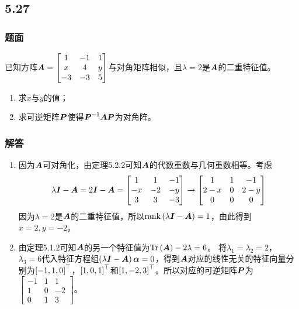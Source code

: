 \documentclass[9pt,xcolor=svgnames]{beamer} %
\begin{document}
\subsection*{5.27}
\begin{frame}
    \frametitle{题面}
    已知方阵\(\boldsymbol{A}=\begin{bmatrix}1&-1&1\\x&4&y\\-3&-3&5\end{bmatrix}\)与对角矩阵相似，且\(\lambda=2\)是\(\boldsymbol{A}\)的二重特征值。
    \begin{enumerate}
        \item 求\(x\)与\(y\)的值；
        \item 求可逆矩阵\(\boldsymbol{P}\)使得\({\boldsymbol{P}}^{-1}\boldsymbol{A}\boldsymbol{P}\)为对角阵。
    \end{enumerate}
\end{frame}

\begin{frame}
    \frametitle{解答}
    \begin{enumerate}
        \item {
              因为\(\boldsymbol{A}\)可对角化，由定理5.2.2可知\(\boldsymbol{A}\)的代数重数与几何重数相等。考虑
              \begin{equation*}
                  \lambda\boldsymbol{I}-\boldsymbol{A}=2\boldsymbol{I}-\boldsymbol{A}=
                  \begin{bmatrix}
                      1  & 1  & -1 \\
                      -x & -2 & -y \\
                      3  & 3  & -3
                  \end{bmatrix}\to
                  \begin{bmatrix}
                      1   & 1 & -1  \\
                      2-x & 0 & 2-y \\
                      0   & 0 & 0
                  \end{bmatrix}
              \end{equation*}
              因为\(\lambda=2\)是\(\boldsymbol{A}\)的二重特征值，所以\(\mathrm{rank}\left( \lambda\boldsymbol{I}-\boldsymbol{A} \right)=1\)，由此得到\(x=2,y=-2\)。
              }\pause
        \item {
              由定理5.1.2可知\(\boldsymbol{A}\)的另一个特征值为\(\mathrm{Tr}\left( \boldsymbol{A} \right)-2\lambda=6\)。
              将\(\lambda_1=\lambda_2=2\)，\(\lambda_3=6\)代入特征方程组\(\left( \lambda\boldsymbol{I}-\boldsymbol{A} \right)\boldsymbol{\alpha}=0\)，得到\(\boldsymbol{A}\)对应的线性无关的特征向量分别为\(\left[ -1,1,0 \right]^\top\)，\(\left[ 1,0,1 \right]^\top\)和\(\left[ 1,-2,3 \right]^\top\)。所以对应的可逆矩阵\(\boldsymbol{P}\)为\(\begin{bmatrix}-1&1&1\\1&0&-2\\0&1&3\end{bmatrix}\)。
              }
    \end{enumerate}
\end{frame}
\end{document}

